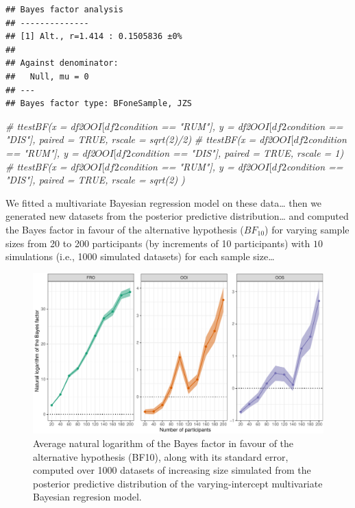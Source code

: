 \documentclass[
  english,
  man,floatsintext]{apa6}
\newenvironment{Shaded}{\begin{snugshade}}{\end{snugshade}}
\newcommand{\CommentTok}[1]{\textcolor[rgb]{0.56,0.35,0.01}{\textit{#1}}}
\begin{document}
\begin{verbatim}
## Bayes factor analysis
## --------------
## [1] Alt., r=1.414 : 0.1505836 ±0%
## 
## Against denominator:
##   Null, mu = 0 
## ---
## Bayes factor type: BFoneSample, JZS
\end{verbatim}

\begin{Shaded}
\begin{Highlighting}[]
\CommentTok{\# ttestBF(x = df2$OOI[df2$condition == "RUM"], y = df2$OOI[df2$condition == "DIS"], paired = TRUE, rscale = sqrt(2)/2)}
\CommentTok{\# ttestBF(x = df2$OOI[df2$condition == "RUM"], y = df2$OOI[df2$condition == "DIS"], paired = TRUE, rscale = 1)}
\CommentTok{\# ttestBF(x = df2$OOI[df2$condition == "RUM"], y = df2$OOI[df2$condition == "DIS"], paired = TRUE, rscale = sqrt(2) )}
\end{Highlighting}
\end{Shaded}

We fitted a multivariate Bayesian regression model on these data\ldots{} then we generated new datasets from the posterior predictive distribution\ldots{} and computed the Bayes factor in favour of the alternative hypothesis (\(BF_{10}\)) for varying sample sizes from 20 to 200 participants (by increments of 10 participants) with \(10\) simulations (i.e., 1000 simulated datasets) for each sample size\ldots{}

\begin{figure}[!htb]

{\centering \includegraphics[width=1\linewidth]{reanalysis_files/figure-latex/simulated-power-1} 

}

\caption{Average natural logarithm of the Bayes factor in favour of the alternative hypothesis (BF10), along with its standard error, computed over 1000 datasets of increasing size simulated from the posterior predictive distribution of the varying-intercept multivariate Bayesian regresion model.}\label{fig:simulated-power}
\end{figure}
\end{document}
